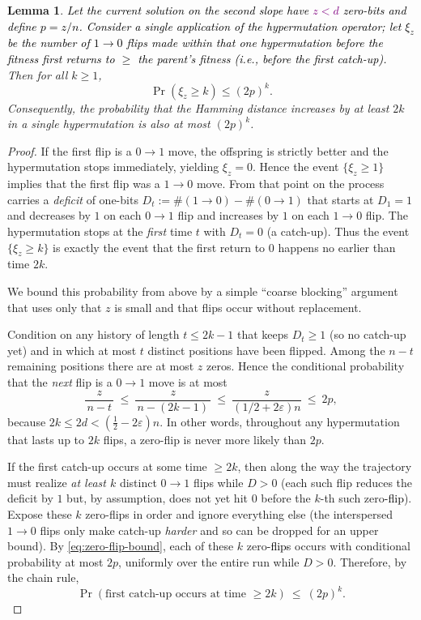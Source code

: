 \documentclass[lettersize,journal]{IEEEtran}
\newcommand{\new}[1]{\textcolor{black}{#1}}
\newcommand{\rerev}[1]{\textcolor{purple}{#1}}
\newtheorem{lemma}{Lemma}
\begin{document}
{\begin{lemma}\label{lem:xi-tail}
	\textcolor{black}{Let the current solution on the second slope have \rerev{$z< d$} zero-bits and
	define $p=z/n$.
	Consider a single application of the hypermutation operator; let $\xi_z$ be
	the number of $1\to0$ flips made \emph{within that one hypermutation} before
	the fitness first returns to $\ge$ the parent's fitness (i.e., before the
	first catch-up).}
	Then for all $k\ge1$,
	\[
	\Pr(\xi_z\ge k)\le (2p)^k.
	\]
	Consequently, the probability that the Hamming distance increases by at least 
	$2k$ in a single hypermutation is also at most $(2p)^k$.
\end{lemma}

\begin{proof}
	If the first flip is a $0\!\to 1$ move, the offspring is strictly better and the hypermutation stops immediately, yielding $\xi_z=0$. Hence the event $\{\xi_z\ge 1\}$ implies that the first flip was a $1\!\to 0$ move. From that point on the process carries a \emph{deficit} of one-bits $D_t:=\#(1\!\to 0)-\#(0\!\to 1)$ that starts at $D_1=1$ and decreases by $1$ on each $0\!\to 1$ flip and increases by $1$ on each $1\!\to 0$ flip. The hypermutation stops at the \emph{first} time $t$ with $D_t=0$ (a catch-up). Thus the event $\{\xi_z\ge k\}$ is exactly the event that the first return to $0$ happens no earlier than time $2k$.
	
	We bound this probability from above by a simple ``coarse blocking'' argument that uses only that $z$ is small and that flips occur without replacement.
	
	\smallskip
	Condition on any history of length $t\le 2k-1$ that keeps $D_t\ge 1$ (so no catch-up yet) and in which at most $t$ distinct positions have been flipped. Among the $n-t$ remaining positions there are at most $z$ zeros. Hence the conditional probability that the \emph{next} flip is a $0\!\to 1$ move is at most
	\begin{equation}\label{eq:zero-flip-bound}
	\frac{z}{\,n-t\,}\ \le\ \frac{z}{\,n-(2k-1)\,}\ \le\ \frac{z}{(1/2+2\varepsilon)n}\ \le\ 2p,
	\end{equation}
	because $2k\le 2d<(\tfrac12-2\varepsilon)n$. In other words, throughout any hypermutation that lasts up to $2k$ flips, a zero-flip is never more likely than $2p$.
	
	\smallskip
	If the first catch-up occurs at some time $\ge 2k$, then along the way the trajectory must realize \emph{at least $k$} distinct $0\!\to 1$ flips while $D>0$ (each such flip reduces the deficit by $1$ but, by assumption, does not yet hit $0$ before the $k$-th such zero\new{-flip}). Expose these $k$ zero-flips in order and ignore everything else (the interspersed $1\!\to 0$ flips only make catch-up \emph{harder} and so can be dropped for an upper bound). By \rerev{\eqref{eq:zero-flip-bound}}, each of these $k$ zero\new{-flips} occurs with conditional probability at most $2p$, uniformly over the entire run while $D>0$. Therefore, by the chain rule,
	\[
	\Pr(\text{first catch-up occurs at time }\ge 2k)\ \le\ (2p)^k.
	\]
	

\end{proof}}
\end{document}
